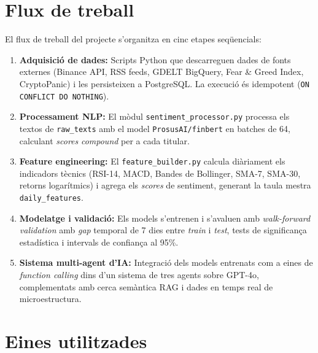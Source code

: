 \documentclass[12pt, a4paper]{report}
\begin{document}
\section{Flux de treball}

El flux de treball del projecte s'organitza en cinc etapes seqüencials:

\begin{enumerate}[leftmargin=*, label=\textbf{Etapa \arabic*:}]
  \item \textbf{Adquisició de dades:} Scripts Python que descarreguen dades de fonts externes (Binance API, RSS feeds, GDELT BigQuery, Fear \& Greed Index, CryptoPanic) i les persisteixen a PostgreSQL. La execució és idempotent (\texttt{ON CONFLICT DO NOTHING}).

  \item \textbf{Processament NLP:} El mòdul \texttt{sentiment\_processor.py} processa els textos de \texttt{raw\_texts} amb el model \texttt{ProsusAI/finbert} en batches de 64, calculant \textit{scores} \textit{compound} per a cada titular.

  \item \textbf{Feature engineering:} El \texttt{feature\_builder.py} calcula diàriament els indicadors tècnics (RSI-14, MACD, Bandes de Bollinger, SMA-7, SMA-30, retorns logarítmics) i agrega els \textit{scores} de sentiment, generant la taula mestra \texttt{daily\_features}.

  \item \textbf{Modelatge i validació:} Els models s'entrenen i s'avaluen amb \textit{walk-forward validation} amb \textit{gap} temporal de 7 dies entre \textit{train} i \textit{test}, tests de significança estadística i intervals de confiança al 95\%.

  \item \textbf{Sistema multi-agent d'IA:} Integració dels models entrenats com a eines de \textit{function calling} dins d'un sistema de tres agents sobre GPT-4o, complementats amb cerca semàntica RAG i dades en temps real de microestructura.
\end{enumerate}

\section{Eines utilitzades}
\end{document}
